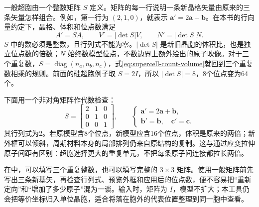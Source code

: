 一般超胞由一个整数矩阵 $S$ 定义。矩阵的每一行说明一条新晶格矢量由原来的三条矢量怎样组合。例如，第一行为 $(2,1,0)$，就表示 $\mathbf a'=2\mathbf a+\mathbf b$。在本书的行向量约定下，晶格、体积和位点数满足
\begin{equation}
 A'=SA,\qquad V'=|\det S|V,\qquad N'=|\det S|N.
 \label{eq:supercell-count-volume}
\end{equation}
$S$ 中的数必须是整数，且行列式不能为零。$|\det S|$ 是新旧晶胞的体积比，也是独立位点数的倍数；$N$ 始终数模型位点，不数边界上额外绘出的原子映像。对于三个重复数，$S=\operatorname{diag}(n_a,n_b,n_c)$，式\eqref{eq:supercell-count-volume}就回到三个重复数相乘的规则。前面的硅超胞例子取 $S=2I$，所以 $|\det S|=8$，8个位点变为64个。

下面用一个非对角矩阵作代数检查：
\[
 S=\begin{bmatrix}2&1&0\\0&1&0\\0&0&1\end{bmatrix},\qquad
 \begin{cases}
 \mathbf a'=2\mathbf a+\mathbf b,\\
 \mathbf b'=\mathbf b,\quad \mathbf c'=\mathbf c.
 \end{cases}
\]
其行列式为2。若原模型含8个位点，新模型应含16个位点，体积是原来的两倍；新外框可以倾斜，周期材料本身的局部排列仍来自原结构的复制。这与通过应变拉伸原子间距有区别：超胞选择更大的重复单元，不把每条原子间连接都拉长两倍。

在中，可以填写三个重复整数，也可以填写完整的 $3\times3$ 矩阵。使用一般矩阵前先写出三条新基矢，再检查行列式、预览外框和应用后的位点数，便不容易把“重新定向”和“增加了多少原子”混为一谈。输入时，矩阵为 $I$，模型不扩大；本工具仍会把等价坐标归入单位晶胞，适合将落在胞外的代表位置整理到同一胞中查看。
